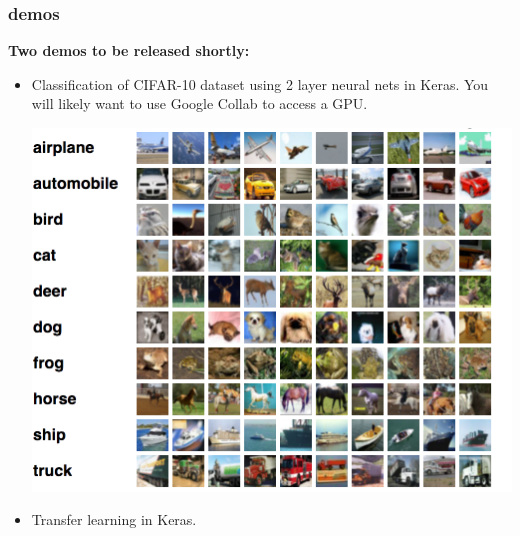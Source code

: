 \documentclass[handout,compress]{beamer}
\begin{document}
\begin{frame}
	\frametitle{demos}
	\textbf{Two demos to be released shortly:}
			\begin{center}
	\begin{itemize}
		\item Classification of CIFAR-10 dataset using 2 layer neural nets in Keras. You will likely want to use Google Collab to access a GPU.
		
		\vspace{.5em}
	\includegraphics[width=.4\textwidth]{cifar10.png}
		
		\item Transfer learning in Keras.
	\end{itemize}
\end{center}
	
\end{frame}
\end{document}
